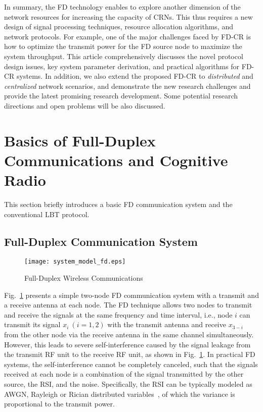 \documentclass[onecolumn,12pt]{IEEEtran}
\begin{document}
In summary, the FD technology enables to explore another dimension of the network resources for increasing the capacity of CRNs. This thus requires a new design of signal processing techniques, resource allocation algorithms, and network protocols. For example, one of the major challenges faced by FD-CR is how to optimize the transmit power for the FD source node to maximize the system throughput. This article comprehensively discusses the novel protocol design issues, key system parameter derivation, and practical algorithms for FD-CR systems. In addition, we also extend the proposed FD-CR to {\em distributed} and { \em centralized} network scenarios, and demonstrate the new research challenges and provide the latest promising research development. Some potential research directions and open problems will be also discussed.


\section{Basics of Full-Duplex Communications and Cognitive Radio}

This section briefly introduces a basic FD communication system and the conventional LBT protocol.

\subsection{Full-Duplex Communication System}

\begin{figure}[ht]
\centering
\texttt{[image: system\_model\_fd.eps]}
\caption{Full-Duplex Wireless Communications} \label{fd}
\end{figure}

Fig.~\ref{fd} presents a simple two-node FD communication system with a transmit and a receive antenna at each node. The FD technique allows two nodes to transmit and receive the signals at the same frequency and time interval, i.e., node $i$ can transmit its signal $x_i~\left(i=1,2\right)$ with the transmit antenna and receive $x_{3-i}$ from the other node via the receive antenna in the same channel simultaneously. However, this leads to severe self-interference caused by the signal leakage from the transmit RF unit to the receive RF unit, as shown in Fig.~\ref{fd}.
In practical FD systems, the self-interference cannot be completely canceled, such that the signals received at each node is a combination of the signal transmitted by the other source, the RSI, and the noise. Specifically, the RSI can be typically modeled as AWGN, Rayleigh or Rician distributed variables~\cite{Choi2010,zhou2014}, of which the variance is proportional to the transmit power.
\end{document}
